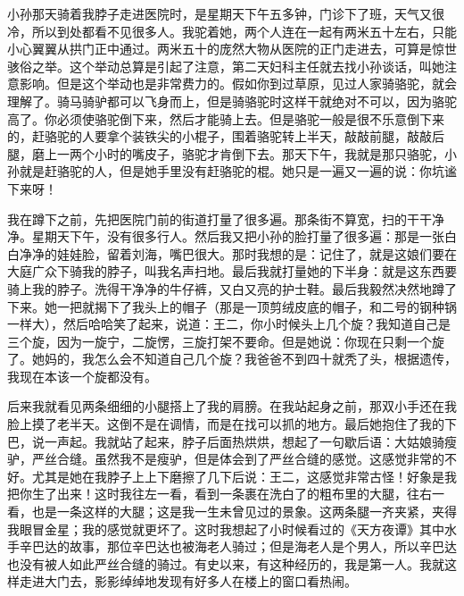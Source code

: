 小孙那天骑着我脖子走进医院时，是星期天下午五多钟，门诊下了班，天气又很冷，所以到处都看不见很多人。我驼着她，两个人连在一起有两米五十左右，只能小心翼翼从拱门正中通过。两米五十的庞然大物从医院的正门走进去，可算是惊世骇俗之举。这个举动总算是引起了注意，第二天妇科主任就去找小孙谈话，叫她注意影响。但是这个举动也是非常费力的。假如你到过草原，见过人家骑骆驼，就会理解了。骑马骑驴都可以飞身而上，但是骑骆驼时这样干就绝对不可以，因为骆驼高了。你必须使骆驼倒下来，然后才能骑上去。但是骆驼一般是很不乐意倒下来的，赶骆驼的人要拿个装铁尖的小棍子，围着骆驼转上半天，敲敲前腿，敲敲后腿，磨上一两个小时的嘴皮子，骆驼才肯倒下去。那天下午，我就是那只骆驼，小孙就是赶骆驼的人，但是她手里没有赶骆驼的棍。她只是一遍又一遍的说：你坑谧下来呀！ 

我在蹲下之前，先把医院门前的街道打量了很多遍。那条街不算宽，扫的干干净净。星期天下午，没有很多行人。然后我又把小孙的脸打量了很多遍：那是一张白白净净的娃娃脸，留着刘海，嘴巴很大。那时我想的是：记住了，就是这娘们要在大庭广众下骑我的脖子，叫我名声扫地。最后我就打量她的下半身：就是这东西要骑上我的脖子。洗得干净净的牛仔裤，又白又亮的护士鞋。最后我毅然决然地蹲了下来。她一把就揭下了我头上的帽子（那是一顶剪绒皮底的帽子，和二号的钢种锅一样大），然后哈哈笑了起来，说道：王二，你小时候头上几个旋？我知道自己是三个旋，因为一旋宁，二旋愣，三旋打架不要命。但是她说：你现在只剩一个旋了。她妈的，我怎么会不知道自己几个旋？我爸爸不到四十就秃了头，根据遗传，我现在本该一个旋都没有。 

后来我就看见两条细细的小腿搭上了我的肩膀。在我站起身之前，那双小手还在我脸上摸了老半天。这倒不是在调情，而是在找可以抓的地方。最后她抱住了我的下巴，说一声起。我就站了起来，脖子后面热烘烘，想起了一句歇后语：大姑娘骑瘦驴，严丝合缝。虽然我不是瘦驴，但是体会到了严丝合缝的感觉。这感觉非常的不好。尤其是她在我脖子上上下磨擦了几下后说：王二，这感觉非常古怪！好象是我把你生了出来！这时我往左一看，看到一条裹在洗白了的粗布里的大腿，往右一看，也是一条这样的大腿；这是我一生未曾见过的景象。这两条腿一齐夹紧，夹得我眼冒金星；我的感觉就更坏了。这时我想起了小时候看过的《天方夜谭》其中水手辛巴达的故事，那位辛巴达也被海老人骑过；但是海老人是个男人，所以辛巴达也没有被人如此严丝合缝的骑过。有史以来，有这种经历的，我是第一人。我就这样走进大门去，影影绰绰地发现有好多人在楼上的窗口看热闹。 

